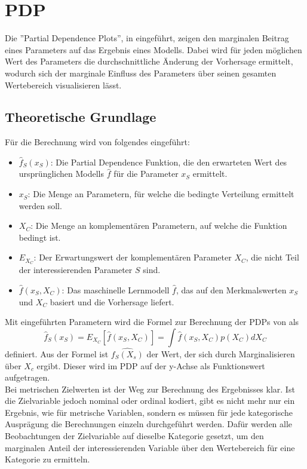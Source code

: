 \documentclass[12pt,titlepage,oneside]{book}
\begin{document}
\newpage
\section{PDP}
Die ''Partial Dependence Plots'', in \cite{friedman2001greedy} eingeführt, zeigen den marginalen Beitrag eines Parameters auf das Ergebnis eines Modells. Dabei wird für jeden möglichen Wert des Parameters die durchschnittliche Änderung der Vorhersage ermittelt, wodurch sich der marginale Einfluss des Parameters über seinen gesamten Wertebereich visualisieren lässt.

\subsection*{Theoretische Grundlage}
Für die Berechnung wird von \cite{friedman2001greedy} folgendes eingeführt:
\begin{itemize}
    \item $\hat{f}_S(x_S)$: Die Partial Dependence Funktion, die den erwarteten Wert des ursprünglichen Modells $\hat{f}$ für die Parameter $x_S$ ermittelt.
    \item $x_S$: Die Menge an Parametern, für welche die bedingte Verteilung ermittelt werden soll.
    \item $X_C$: Die Menge an komplementären Parametern, auf welche die Funktion bedingt ist.
    \item $E_{X_C}$: Der Erwartungswert der komplementären Parameter $X_C$, die nicht Teil der interessierenden Parameter $S$ sind.
    \item $\hat{f}(x_S, X_C)$: Das maschinelle Lernmodell $\hat{f}$, das auf den Merkmalswerten $x_S$ und $X_C$ basiert und die Vorhersage liefert.
\end{itemize}
Mit eingeführten Parametern wird die Formel zur Berechnung der PDPs von \cite{friedman2001greedy} als
\begin{equation}
    \hat{f}_S(x_S) = E_{X_C}[\hat{f}(x_S, X_C)] = \int \hat{f}(x_S, X_C) p(X_C) dX_C
\end{equation}
definiert. Aus der Formel ist $\hat{f_S(X_s)}$ der Wert, der sich durch Marginalisieren über $X_c$ ergibt. Dieser wird im PDP auf der y-Achse als Funktionswert aufgetragen.\\

Bei metrischen Zielwerten ist der Weg zur Berechnung des Ergebnisses klar. Ist die Zielvariable jedoch nominal oder ordinal kodiert, gibt es nicht mehr nur ein Ergebnis, wie für metrische Variablen, sondern es müssen für jede kategorische Ausprägung die Berechnungen einzeln durchgeführt werden. Dafür werden alle Beobachtungen der Zielvariable auf dieselbe Kategorie gesetzt, um den marginalen Anteil der interessierenden Variable über den Wertebereich für eine Kategorie zu ermitteln. \\
\end{document}
